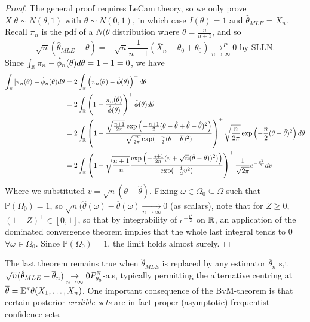 \documentclass[a4paper]{article}
\begin{document}
\begin{proof}
	The general proof requires LeCam theory, so we only prove $X|\theta \sim N(\theta, 1)$ with  $\theta \sim N(0,1)$, in which case $I(\theta) = 1$ and $\hat{\theta}_{MLE} = \overline{X}_{n}$. Recall $\pi_n$ is the pdf of a $N(\overline{\theta}$ distribution where $ \overline{\theta} = \frac{n}{n+1}$, and so
	\[
		\sqrt{n} (\hat{\theta}_{MLE} - \theta) = - \sqrt{n} \frac{1}{n+1} (\overline{X}_n - \theta_0 + \theta_0) \underset{n\to \infty}{\to ^{P}} 0 \text{ by SLLN.}
	\] 
	Since $\int_{\mathbb{R}} \pi_n - \hat{\phi}_n(\theta) d\theta = 1-1 = 0$, we have 
	\begin{align*}
		\int_{\mathbb{R}} |\pi_n (\theta) - \hat{\phi}_n(\theta) d\theta &= 2\int_{\mathbb{R}} \left( \pi_n(\theta) - \hat{\phi}(\theta) \right)^{+} d\theta  \\
		&= 2\int_{\mathbb{R}} \left( 1 - \frac{\pi_n(\theta)}{\hat{\phi}(\theta)} \right) ^{+} \hat{\phi}(\theta) d\theta \\
		&= 2\int_{\mathbb{R}} \left( 1 - \frac{\sqrt{\frac{n+1}{2\pi}} \exp\left(-\frac{n+1}{2}(\theta - \hat{\theta} + \hat{\theta} - \hat{\theta})^2\right) }{\sqrt{\frac{n}{2\pi}} \exp(-\frac{n}{2}(\theta - \overline{\theta})^2) } \right)^{+} \sqrt{\frac{n}{2\pi}} \exp\left( -\frac{n}{2}(\theta - \hat{\theta})^2 \right) d\theta  \\
		&= 2\int_{\mathbb{R}} \left( 1 - \sqrt{\frac{n+1}{n}} \frac{\exp\left( - \frac{n+1}{2n} (v + \sqrt{n} (\hat{\theta} - \theta))^2) \right) }{\exp(-\frac{1}{2}v^2) } \right)^{+} \frac{1}{\sqrt{2\pi} } e^{-\frac{v^2}{2}} dv
	\end{align*}
	Where we substituted $v = \sqrt{n} (\theta - \hat{\theta})$. Fixing  $\omega \in \Omega_0 \subseteq \Omega$ such that $\mathbb{P}\left( \Omega_0 \right) = 1$, so $\sqrt{n} (\hat{\theta}(\omega) - \overline{\theta}(\omega) \underset{n\to \infty}{\to } 0 $ (as scalars), note that for $Z\ge 0$, $(1-Z)^{+} \in [0,1]$, so that by integrability of $e^{-\frac{v^2}{2}}$ on $\mathbb{R}$, an application of the dominated convergence theorem implies that the whole last integral tends to $0$ $\forall \omega \in \Omega_0$. Since $\mathbb{P}\left( \Omega_0 \right) = 1$, the limit holds almost surely.
\end{proof}

The last theorem remains true when $\hat{\theta}_{MLE}$ is replaced by any estimator $\overline{\theta}_n$ s,t $\sqrt{n} (\hat{\theta}_{MLE} - \overline{\theta}_n) \underset{n\to \infty}{\to } 0 P_{\theta_0}^{\mathbb{N}}$-a.s, typically permitting the alternative centring at $\overline{\theta} = \mathbb{E}^{\pi} \theta(X_1, \ldots, X_n)$. One important consequence of the BvM-theorem is that certain posterior \textit{credible sets} are in fact proper (asymptotic) frequentist confidence sets.
\end{document}
